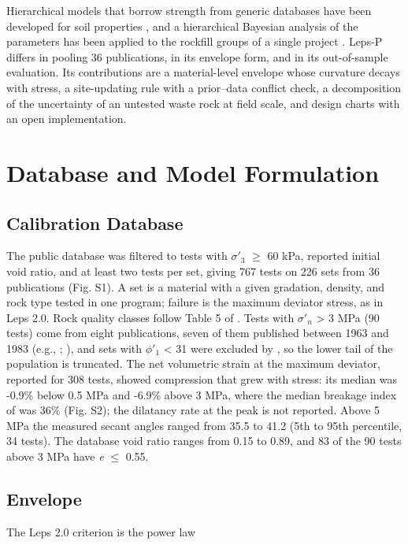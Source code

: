 \documentclass[Journal,letterpaper]{ascelike-new}
\begin{document}
Hierarchical models that borrow strength from generic databases have been developed for soil properties \cite{ching2019,ching2021}, and a hierarchical Bayesian analysis of the  parameters has been applied to the rockfill groups of a single project \cite{contreras2022,contreras2025}. Leps-P differs in pooling 36 publications, in its envelope form, and in its out-of-sample evaluation. Its contributions are a material-level envelope whose curvature decays with stress, a site-updating rule with a prior--data conflict check, a decomposition of the uncertainty of an untested waste rock at field scale, and design charts with an open implementation.

\section{Database and Model Formulation}
\subsection{Calibration Database}
The public database \cite{arrieta2025} was filtered to tests with $\sigma'_3$ $\ge$ 60 kPa, reported initial void ratio, and at least two tests per set, giving 767 tests on 226 sets from 36 publications (Fig. S1). A set is a material with a given gradation, density, and rock type tested in one program; failure is the maximum deviator stress, as in Leps 2.0. Rock quality classes follow Table 5 of . Tests with $\sigma'_n$ > 3 MPa (90 tests) come from eight publications, seven of them published between 1963 and 1983 (e.g., ; ), and sets with $\phi'_1$ < 31\textdegree{} were excluded by , so the lower tail of the population is truncated. The net volumetric strain at the maximum deviator, reported for 308 tests, showed compression that grew with stress: its median was -0.9\% below 0.5 MPa and -6.9\% above 3 MPa, where the median breakage index of  was 36\% (Fig. S2); the dilatancy rate at the peak is not reported. Above 5 MPa the measured secant angles ranged from 35.5\textdegree{} to 41.2\textdegree{} (5th to 95th percentile, 34 tests). The database void ratio ranges from 0.15 to 0.89, and 83 of the 90 tests above 3 MPa have \textit{e} $\le$ 0.55.

\subsection{Envelope}
The Leps 2.0 criterion is the power law
\end{document}

